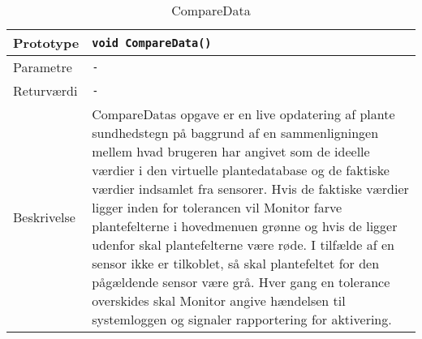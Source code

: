 \begin{table}[h]
\begin{tabularx}{\textwidth}{| L{2.5 cm} | Z |} \hline
Prototype & \texttt{void CompareData()} \\\hline
Parametre & \texttt{-} \\\hline
Returværdi & \texttt{-} \\\hline
Beskrivelse & CompareDatas opgave er en live opdatering af plante sundhedstegn på baggrund af en sammenligningen mellem hvad brugeren har angivet som de ideelle værdier i den virtuelle plantedatabase og de faktiske værdier indsamlet fra sensorer. Hvis de faktiske værdier ligger inden for tolerancen vil Monitor farve plantefelterne i hovedmenuen grønne og hvis de ligger udenfor skal plantefelterne være røde. I tilfælde af en sensor ikke er tilkoblet, så skal plantefeltet for den pågældende sensor være grå.
Hver gang en tolerance overskides skal Monitor angive hændelsen til systemloggen og signaler rapportering for aktivering.
 \\\hline
\end{tabularx}
\caption{CompareData}
\label{table:CompareData}
\end{table}
